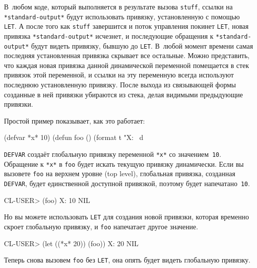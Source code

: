 В~любом коде, который выполняется в результате вызова \lstinline{stuff}, ссылки на \lstinline{*standard-output*}
будут использовать привязку, установленную с помощью \lstinline{LET}. А после того как \lstinline{stuff}
завершится и поток управления покинет \lstinline{LET}, новая привязка \lstinline{*standard-output*}
исчезнет, и последующие обращения к \lstinline{*standard-output*} будут видеть привязку, бывшую до
\lstinline{LET}. В~любой момент времени самая последняя установленная привязка скрывает все
остальные. Можно представить, что каждая новая привязка данной динамической переменной
помещается в стек привязок этой переменной, и ссылки на эту переменную всегда используют
последнюю установленную привязку. После выхода из связывающей формы созданные в ней
привязки убираются из стека, делая видимыми предыдующие привязки.

Простой пример показывает, как это работает:

\begin{myverb}
(defvar *x* 10)
(defun foo () (format t "X: ~d~%
\end{myverb}

\lstinline{DEFVAR} создаёт глобальную привязку переменной \lstinline{*x*} со значением~\lstinline{10}. Обращение к
\lstinline{*x*} в \lstinline{foo} будет искать текущую привязку динамически. Если вы вызовете \lstinline{foo} на верхнем
уровне (top level), глобальная привязка, созданная \lstinline{DEFVAR}, будет
единственной доступной привязкой, поэтому будет напечатано~\lstinline{10}.

\begin{myverb}
CL-USER> (foo)
X: 10
NIL
\end{myverb}

Но вы можете использовать \lstinline{LET} для создания новой привязки, которая временно
скроет глобальную привязку, и \lstinline{foo} напечатает другое значение.

\begin{myverb}
CL-USER> (let ((*x* 20)) (foo))
X: 20
NIL
\end{myverb}

Теперь снова вызовем \lstinline{foo} без \lstinline{LET}, она опять будет видеть глобальную
привязку.

